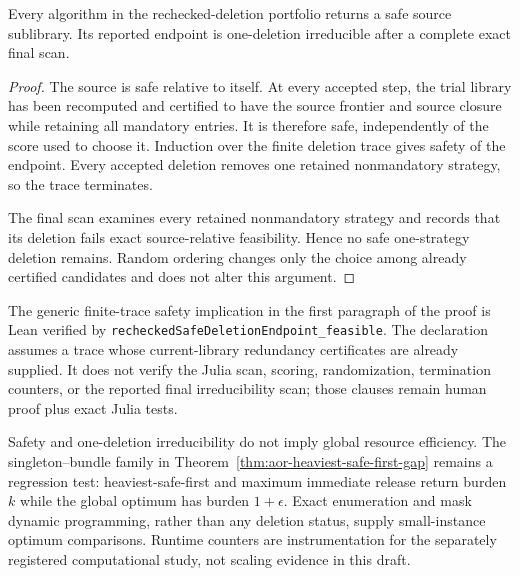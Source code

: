 \begin{proposition}
\label{prop:aor-certified-deletion-endpoint}
Every algorithm in the rechecked-deletion portfolio returns a safe source
sublibrary.  Its reported endpoint is one-deletion irreducible after a
complete exact final scan.
\end{proposition}

\begin{proof}
The source is safe relative to itself.  At every accepted step, the trial
library has been recomputed and certified to have the source frontier and
source closure while retaining all mandatory entries.  It is therefore safe,
independently of the score used to choose it.  Induction over the finite
deletion trace gives safety of the endpoint.  Every accepted deletion removes
one retained nonmandatory strategy, so the trace terminates.

The final scan examines every retained nonmandatory strategy and records that
its deletion fails exact source-relative feasibility.  Hence no safe
one-strategy deletion remains.  Random ordering changes only the choice among
already certified candidates and does not alter this argument.
\end{proof}

The generic finite-trace safety implication in the first paragraph of the
proof is Lean verified by
\texttt{recheckedSafeDeletionEndpoint\_feasible}.  The declaration assumes a
trace whose current-library redundancy certificates are already supplied.  It
does not verify the Julia scan, scoring, randomization, termination counters,
or the reported final irreducibility scan; those clauses remain human proof
plus exact Julia tests.

Safety and one-deletion irreducibility do not imply global resource
efficiency.  The singleton--bundle family in
Theorem~\ref{thm:aor-heaviest-safe-first-gap} remains a regression test:
heaviest-safe-first and maximum immediate release return burden $k$ while the
global optimum has burden $1+\epsilon$.  Exact enumeration and mask dynamic
programming, rather than any deletion status, supply small-instance optimum
comparisons.  Runtime counters are instrumentation for the separately
registered computational study, not scaling evidence in this draft.
